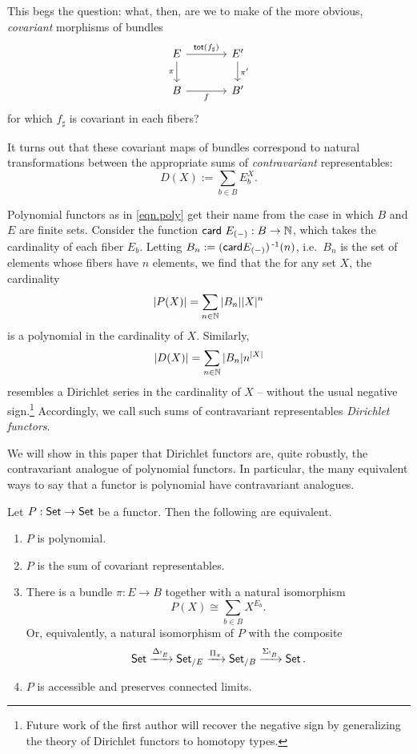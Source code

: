 This begs the question: what, then, are we to make of the more obvious,
\emph{covariant} morphisms of bundles
\[
  \begin{tikzcd}[column sep=large]
E \arrow[r, "\term{tot}(f_{\sharp})"] \arrow[d, "\pi"'] & E' \arrow[d, "\pi'"] \\
B \arrow[r, "f"']                                       & B'                  
\end{tikzcd}
\]
for which $f_\sharp$ is covariant
in each fibers?

It turns out that these covariant maps of bundles correspond to natural
transformations between the appropriate sums of \emph{contravariant}
representables:
$$D(X) := \sum_{b \in B} E_b^X.$$

Polynomial functors as in \eqref{eqn.poly} get their name from the case in which
$B$ and $E$ are finite sets. Consider the function $\mathsf{{card}}~E_{(-)} : B \to
\operatorname{\mathbb{N}}$, which takes the cardinality of each fiber $E_b$. Letting $B_n :=
(\mathsf{{card}}E_{(-)})\operatorname{^{-1}}(n)$, i.e.\ $B_n$ is the set of elements whose fibers have $n$ elements,
we find that the for any set $X$, the cardinality
$$|P(X)| = \sum_{n \in \operatorname{\mathbb{N}}} |B_n||X|^n$$
is a polynomial in the cardinality of $X$. Similarly,
$$|D(X)| = \sum_{n \in \operatorname{\mathbb{N}}} |B_n|n^{|X|}$$
resembles a Dirichlet series in the cardinality of $X$ -- without the usual
negative sign.\footnote{Future work of the first author will recover the
  negative sign by generalizing the theory of Dirichlet functors to homotopy
  types.} Accordingly, we call such
sums of contravariant representables \emph{Dirichlet functors}.

We will show in this paper that Dirichlet functors are, quite robustly, the
contravariant analogue of polynomial functors. In particular, the many equivalent ways to
say that a functor is polynomial have contravariant analogues.
\begin{thm}\label{thm:polynomial.set.characterization}
  Let $P : \operatorname{\mathsf{{Set}}} \to \operatorname{\mathsf{{Set}}}$ be a functor. Then the following are equivalent.
  \begin{enumerate}
  \item $P$ is polynomial.
  \item $P$ is the sum of covariant representables.
  \item There is a bundle $\pi : E \to B$ together with a natural isomorphism
    $$P(X) \cong \sum_{b \in B} X^{E_b}.$$
    Or, equivalently, a natural isomorphism of $P$ with the composite
    $$\operatorname{\mathsf{{Set}}} \xrightarrow{{\Delta_{!_E}}} \operatorname{\mathsf{{Set}}}_{/E} \xrightarrow{{\Pi_\pi}} \operatorname{\mathsf{{Set}}}_{/B} \xrightarrow{{\Sigma_{!_B}}} \operatorname{\mathsf{{Set}}}.$$
  \item $P$ is accessible and preserves connected limits.
  \end{enumerate}
\end{thm}

